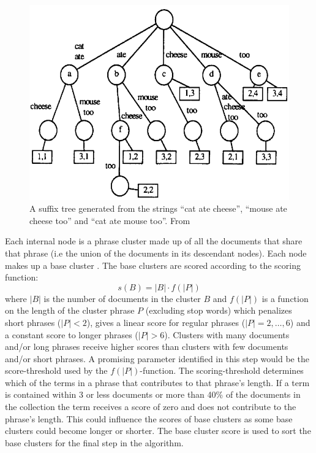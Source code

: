 \begin{figure}[!ht]
  \begin{center}
    \includegraphics[totalheight=0.3\textheight]{Figures/suffixtree}
  \end{center}
  \caption{A suffix tree generated from the strings “cat ate cheese”, “mouse ate cheese too” and “cat ate mouse too”. From  \protect \parencite[][48]{Oren1998}}
  \label{fig:suffixtree}
\end{figure}

Each internal node is a phrase cluster made up of all the documents that share that phrase (i.e the union of the documents in its descendant nodes). Each node makes up a base cluster \cite{Oren1998}. The base clusters are scored according to the scoring function: 
\begin{displaymath}s(B) = 
\vert B \vert \cdot f(\vert P \vert)
\end{displaymath} 
where \(\vert B \vert\) 
is the number of documents in the cluster \(B\) and  \(f(\vert P \vert)\) is a function on the length of the cluster phrase \(P\) (excluding stop words) which penalizes short phrases (\( \vert P \vert < 2\)), gives a linear score for regular phrases (\(\vert P \vert = {2,\dots,6}\)) and a constant score to longer phrases (\( \vert P \vert > 6\)). Clusters with many documents and/or long phrases receive higher scores than clusters with few documents and/or short phrases. A promising parameter identified in this step would be the score-threshold used by the \(f(\vert P \vert)\)-function. The scoring-threshold determines which of the terms in a phrase that contributes to that phrase's length. If a term is contained within 3 or less documents or more than 40\% of the documents in the collection the term receives a score of zero and does not contribute to the phrase's length. This could influence the scores of base clusters as some base clusters could become longer or shorter. The base cluster score is used to sort the base clusters for the final step in the \STC algorithm.

